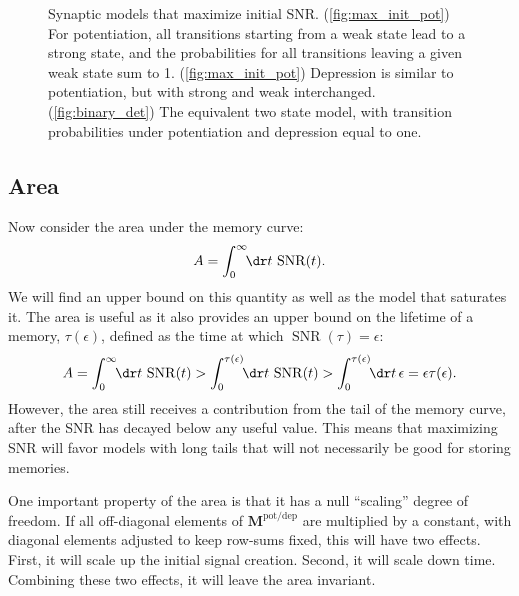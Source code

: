 \documentclass{article} %
\DeclareMathOperator{\snr}{SNR}
\newcommand{\M}{\mathbf{M}}
\newcommand{\potdep}{^{\text{pot/dep}}}
\begin{document}
\begin{figure}
 \begin{center}
 \begin{myenuma}
  \item\hp{}\label{fig:max_init_pot}\hp
  \item{}\label{fig:max_init_dep}\hp
  \item{}\label{fig:binary_det}
  \end{myenuma}
 \end{center}
  \caption{Synaptic models that maximize initial SNR.
  (\ref{fig:max_init_pot}) For potentiation, all transitions starting from a weak state lead to a strong state, and the probabilities for all transitions leaving a given weak state sum to 1.
  (\ref{fig:max_init_pot}) Depression is similar to potentiation, but with strong and weak interchanged.
  (\ref{fig:binary_det}) The equivalent two state model, with transition probabilities under potentiation and depression equal to one.
  }\label{fig:maxinit}
\end{figure}


\subsection{Area}\label{sec:area}

Now consider the area under the memory curve:
%
\begin{equation}\label{eq:area}
  A = \int_0^\infty\!\!\dr t \, \snr(t).
\end{equation}
%
We will find an upper bound on this quantity as well as the model that saturates it.
The area is useful as it also provides an upper bound on the lifetime of a memory, $\tau(\epsilon)$, defined as the time at which $\snr(\tau)=\epsilon$:
%
\begin{equation}\label{eq:arealife}
  A = \int_0^\infty\!\!\dr t \, \snr(t) 
    > \int_0^{\tau(\epsilon)}\!\!\dr t \, \snr(t)
    > \int_0^{\tau(\epsilon)}\!\!\dr t \, \epsilon
    = \epsilon \tau(\epsilon).
\end{equation}
%
However, the area still receives a contribution from the tail of the memory curve, after the SNR has decayed below any useful value.
This means that maximizing SNR will favor models with long tails that will not necessarily be good for storing memories.

One important property of the area is that it has a null ``scaling'' degree of freedom.
If all off-diagonal elements of $\M\potdep$ are multiplied by a constant, with diagonal elements adjusted to keep row-sums fixed, this will have two effects.
First, it will scale up the initial signal creation.
Second, it will scale down time.
Combining these two effects, it will leave the area invariant.
\end{document}
